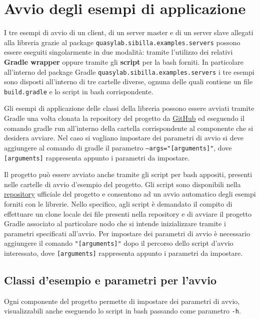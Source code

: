 


\section{Avvio degli esempi di applicazione}
I tre esempi di avvio di un client, di un server master e di un server slave allegati alla libreria grazie al package \texttt{quasylab.sibilla.examples.servers} possono essere eseguiti singolarmente in due modalità: tramite l’utilizzo dei relativi \textbf{Gradle wrapper} oppure tramite gli \textbf{script} per la bash forniti. In particolare all’interno del package Gradle \texttt{quasylab.sibilla.examples.servers} i tre esempi sono disposti all’interno di tre cartelle diverse, ognuna delle quali contiene un file \texttt{build.gradle} e lo script in bash corrispondente.

Gli esempi di applicazione delle classi della libreria possono essere avviati tramite Gradle una volta clonata la repository del progetto da \href{https://github.com/quasylab/sibilla.git}{GitHub} ed eseguendo il comando gradle run all’interno della cartella corrispondente al componente che si desidera avviare. Nel caso si vogliano impostare dei parametri di avvio si deve aggiungere al comando di gradle il parametro \texttt{--args="[arguments]"}, dove \texttt{[arguments]} rappresenta appunto i parametri da impostare.

Il progetto può essere avviato anche tramite gli script per bash appositi, presenti nelle cartelle di avvio d'esempio del progetto. Gli script sono disponibili nella \href{https://github.com/quasylab/sibilla.git}{repository} ufficiale del progetto e consentono ad un avvio automatico degli esempi forniti con le librerie. Nello specifico, agli script è demandato il compito di effettuare un clone locale dei file presenti nella repository e di avviare il progetto Gradle associato al particolare nodo che si intende inizializzare tramite i parametri specificati all'avvio. Per impostare dei parametri di avvio è necessario aggiungere il comando \texttt{"[arguments]"} dopo il percorso dello script d'avvio interessato, dove \texttt{[arguments]} rappresenta appunto i parametri da impostare.

\subsection{Classi d'esempio e parametri per l'avvio}

Ogni componente del progetto permette di impostare dei parametri di avvio, visualizzabili anche eseguendo lo script in bash passando come parametro \texttt{-h}.

